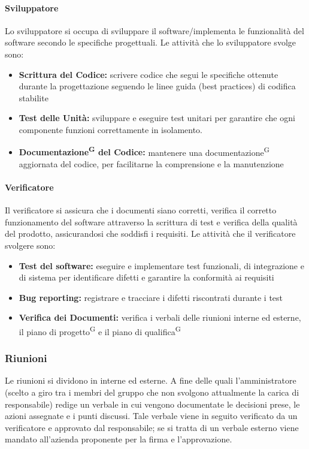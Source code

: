 \documentclass[a4paper, 11pt]{article}
\begin{document}
\paragraph{Sviluppatore}
Lo sviluppatore si occupa di sviluppare il software/implementa le funzionalità del software secondo le specifiche progettuali.
    Le attività che lo sviluppatore svolge sono:
    \begin{itemize}
        \item \textbf{Scrittura del Codice:} scrivere codice che segui le specifiche ottenute durante la progettazione seguendo le linee guida (best practices) di codifica stabilite
        \item \textbf{Test delle Unità:} sviluppare e eseguire test unitari per garantire che ogni componente funzioni correttamente in isolamento.
        \item \textbf{Documentazione\textsuperscript{G} del Codice:} mantenere una documentazione\textsuperscript{G} aggiornata del codice, per facilitarne la comprensione e la manutenzione
    \end{itemize}
\paragraph{Verificatore}
Il verificatore si assicura che i documenti siano corretti, verifica il corretto funzionamento del software attraverso la scrittura di test e verifica della qualità del prodotto, assicurandosi che soddisfi i requisiti.
    Le attività che il verificatore svolgere sono:
    \begin{itemize}
        \item \textbf{Test del software:} eseguire e implementare test funzionali, di integrazione e di sistema per identificare difetti e garantire la conformità ai requisiti
        \item \textbf{Bug reporting:} registrare e tracciare i difetti riscontrati durante i test        
        \item \textbf{Verifica dei Documenti:} verifica i verbali delle riunioni interne ed esterne, il piano di progetto\textsuperscript{G} e il piano di qualifica\textsuperscript{G}
    \end{itemize}
\subsubsection{Riunioni}
Le riunioni si dividono in interne ed esterne. A fine delle quali l'amministratore (scelto a giro tra i membri del gruppo che non svolgono attualmente la carica di responsabile) redige un verbale in cui vengono documentate le decisioni prese, le azioni assegnate e i punti discussi. Tale verbale viene in seguito verificato da un verificatore e approvato dal responsabile; se si tratta di un verbale esterno viene mandato all'azienda proponente per la firma e l'approvazione.
\end{document}
